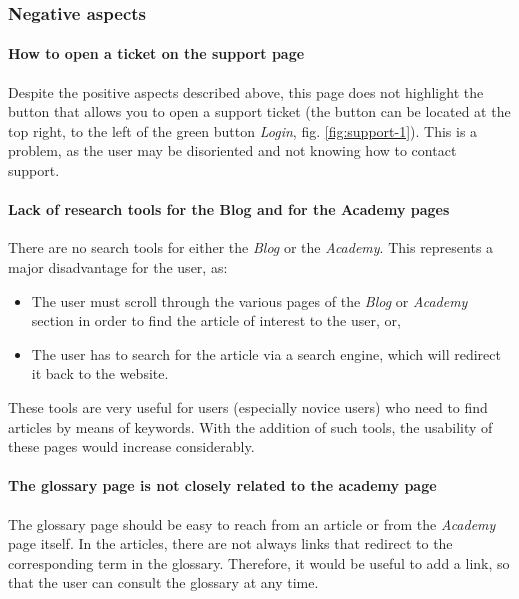 \subsubsection{Negative aspects}

\paragraph{How to open a ticket on the support page}

Despite the positive aspects described above, this page does not highlight 
the button that allows you to open a support ticket (the button can be 
located at the top right, to the left of the green button \textit{Login}, 
fig. \ref{fig:support-1}). This is a problem, as the user may be 
disoriented and not knowing how to contact support.

\paragraph{Lack of research tools for the Blog and for the Academy pages}

There are no search tools for either the \textit{Blog} or the 
\textit{Academy}. This represents a major disadvantage for the user, as:
\begin{itemize}
  \item The user must scroll through the various pages of the \textit{Blog} 
  or \textit{Academy} section in order to find the article of interest to 
  the user, or,

  \item The user has to search for the article via a search engine, which 
  will redirect it back to the website.
\end{itemize}
These tools are very useful for users (especially novice users) who need 
to find articles by means of keywords. With the addition of such tools, 
the usability of these pages would increase considerably.

\paragraph{The glossary page is not closely related to the academy page}

The glossary page should be easy to reach from an article or from the 
\textit{Academy} page itself. In the articles, there are not always links 
that redirect to the corresponding term in the glossary. Therefore, it 
would be useful to add a link, so that the user can consult the glossary 
at any time.

